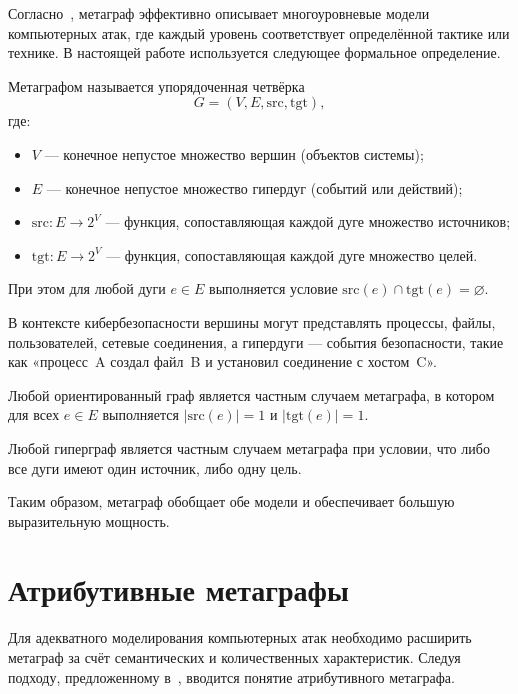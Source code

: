 \documentclass{article}
\begin{document}
Согласно~\cite{Latypov2020}, метаграф эффективно описывает многоуровневые модели компьютерных атак, где каждый уровень соответствует определённой тактике или технике. В настоящей работе используется следующее формальное определение.

\begin{definition}
    Метаграфом называется упорядоченная четвёрка
    \[
        G = (V, E, \mathrm{src}, \mathrm{tgt}),
    \]
    где:
    \begin{itemize}
        \item $V$ — конечное непустое множество вершин (объектов системы);
        \item $E$ — конечное непустое множество гипердуг (событий или действий);
        \item $\mathrm{src}: E \rightarrow 2^V$ — функция, сопоставляющая каждой дуге множество источников;
        \item $\mathrm{tgt}: E \rightarrow 2^V$ — функция, сопоставляющая каждой дуге множество целей.
    \end{itemize}
        При этом для любой дуги $e \in E$ выполняется условие $\mathrm{src}(e) \cap \mathrm{tgt}(e) = \varnothing$.
\end{definition}

В контексте кибербезопасности вершины могут представлять процессы, файлы, пользователей, сетевые соединения, а гипердуги — события безопасности, такие как «процесс~A создал файл~B и установил соединение с хостом~C».

\begin{lemma}
    Любой ориентированный граф является частным случаем метаграфа, в котором для всех $e \in E$ выполняется $|\mathrm{src}(e)| = 1$ и $|\mathrm{tgt}(e)| = 1$.
\end{lemma}

\begin{lemma}
    Любой гиперграф является частным случаем метаграфа при условии, что либо все дуги имеют один источник, либо одну цель.
\end{lemma}

Таким образом, метаграф обобщает обе модели и обеспечивает большую выразительную мощность.

\section{Атрибутивные метаграфы}\label{sec:ch2/sec2}

Для адекватного моделирования компьютерных атак необходимо расширить метаграф за счёт семантических и количественных характеристик. Следуя подходу, предложенному в~\cite{Latypov2020}, вводится понятие атрибутивного метаграфа.
\end{document}
